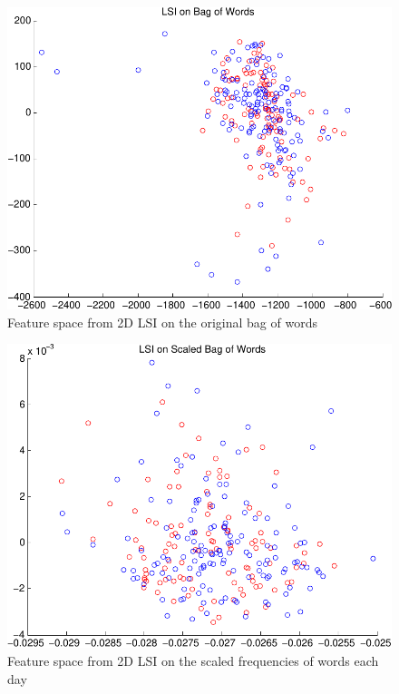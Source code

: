 \documentclass[10pt, twocolumn]{article}
\begin{document}
\begin{figure}
\centering
\includegraphics[scale=0.4]{plots/lsiorig.pdf}
\caption{Feature space from 2D LSI on the original bag of words}
\label{lsiorig}
\end{figure}

\begin{figure}
\centering
\includegraphics[scale=0.4]{plots/lsiscaled.pdf}
\caption{Feature space from 2D LSI on the scaled frequencies of words each day}
\label{lsiscaled}
\end{figure}
\end{document}
